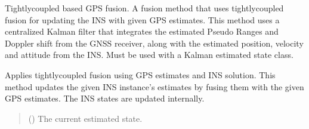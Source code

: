 \documentclass[letterpaper,10pt,english]{sphinxmanual}
\begin{document}

\begin{fulllineitems}
\label{\detokenize{modules/gps/fusion:qnav.gps.fusion.GpsTightFusion}}
\pysigstartsignatures
{}
\pysigstopsignatures
\sphinxAtStartPar
Tightly\sphinxhyphen{}coupled based GPS fusion.
A fusion method that uses tightly\sphinxhyphen{}coupled fusion for updating the INS
with given GPS estimates. This method uses a centralized Kalman filter
that integrates the estimated Pseudo Ranges and Doppler shift from the
GNSS receiver, along with the estimated position, velocity and attitude
from the INS. Must be used with a Kalman estimated state class.

\begin{fulllineitems}
\label{\detokenize{modules/gps/fusion:qnav.gps.fusion.GpsTightFusion.perform_fusion}}
\pysigstartsignatures
{}
\pysigstopsignatures
\sphinxAtStartPar
Applies tightly\sphinxhyphen{}coupled fusion using GPS estimates and INS solution.
This method updates the given INS instance’s estimates by fusing them
with the given GPS estimates. The INS states are updated internally.
\begin{quote}\begin{description}
\sphinxAtStartPar
{} ({\hyperref[\detokenize{modules/estimation/state:qnav.estimation.state.KalmanEstimatedState}]{}}) \textendash{} The current estimated state.

\end{description}\end{quote}

\end{fulllineitems}


\end{fulllineitems}
\end{document}
